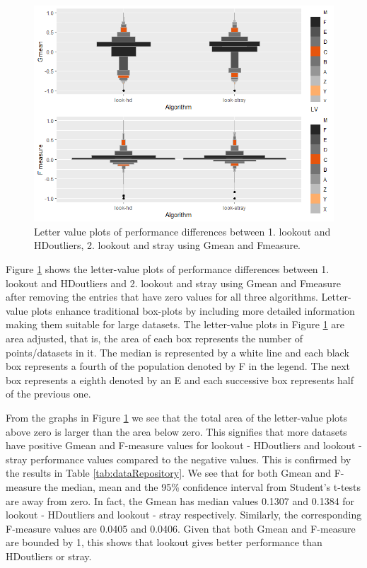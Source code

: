 \documentclass[11pt,a4paper,]{article}
\theoremstyle{definition}
\theoremstyle{definition}
\theoremstyle{definition}
\theoremstyle{remark}
\begin{document}
\begin{figure}[!ht]
    \centering
    \includegraphics[scale=0.7]{../Graphics/lvplots.png}
    \caption{Letter value plots of performance differences between 1. lookout and HDoutliers, 2. lookout and stray using Gmean and Fmeasure.}
    \label{fig:lvplots}
\end{figure}

Figure \ref{fig:lvplots} shows the letter-value plots \autocite{lvplots} of performance differences between
1. lookout and HDoutliers and
2. lookout and stray
using Gmean and Fmeasure after removing the entries that have zero values for all three algorithms. Letter-value plots enhance traditional box-plots by including more detailed information making them suitable for large datasets. The letter-value plots in Figure \ref{fig:lvplots} are area adjusted, that is, the area of each box represents the number of points/datasets in it. The median is represented by a white line and each black box represents a fourth of the population denoted by F in the legend. The next box represents a eighth denoted by an E and each successive box represents half of the previous one.

From the graphs in Figure \ref{fig:lvplots} we see that the total area of the letter-value plots above zero is larger than the area below zero. This signifies that more datasets have positive Gmean and F-measure values for lookout - HDoutliers and lookout - stray performance values compared to the negative values. This is confirmed by the results in Table \ref{tab:dataRepository}. We see that for both Gmean and F-measure the median, mean and the 95\% confidence interval from Student's t-tests are away from zero. In fact, the Gmean has median values 0.1307 and 0.1384 for lookout - HDoutliers and lookout - stray respectively. Similarly, the corresponding F-measure values are 0.0405 and 0.0406. Given that both Gmean and F-measure are bounded by 1, this shows that lookout gives better performance than HDoutliers or stray.
\end{document}
